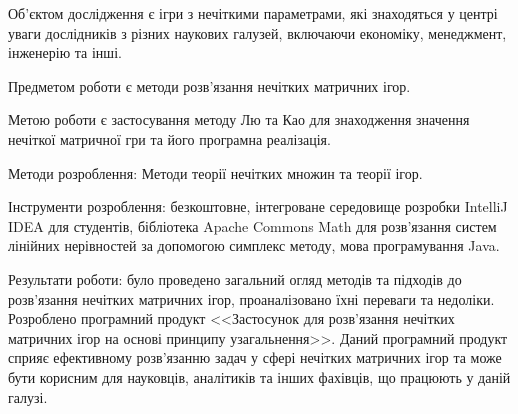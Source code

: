 \documentclass[14pt, a4paper, oneside]{extarticle}
\numberwithin{equation}{section}
\begin{document}
Об'єктом дослідження є ігри з нечіткими параметрами, які знаходяться у центрі уваги дослідників з різних наукових галузей, включаючи економіку, менеджмент, інженерію та інші. 

Предметом роботи є методи розв'язання нечітких матричних ігор.

Метою роботи є застосування методу Лю та Као для знаходження значення нечіткої матричної гри та його програмна реалізація.

Методи розроблення: Методи теорії нечітких множин та теорії ігор. 

Інструменти розроблення: безкоштовне, інтегроване середовище розробки IntelliJ IDEA для студентів, бібліотека Apache Commons Math для розв'язання систем лінійних нерівностей за допомогою симплекс методу, мова програмування Java.

Результати роботи: було проведено загальний огляд методів та підходів до розв'язання нечітких матричних ігор, проаналізовано їхні переваги та недоліки. Розроблено програмний продукт <<Застосунок для розв'язання нечітких матричних ігор на основі принципу узагальнення>>.
Даний програмний продукт сприяє ефективному розв'язанню задач у сфері нечітких матричних ігор та може бути корисним для науковців, аналітиків та інших фахівців, що працюють у даній галузі.



\clearpage
\renewcommand\cftsecdotsep{\cftdot}
\cftsetpnumwidth{9pt}

\renewcommand{\cfttoctitlefont}{\hfill\Large\bfseries\MakeUppercase}
\renewcommand{\cftaftertoctitle}{\hfill}

\renewcommand{\cftsecfont}{\normalfont}
\renewcommand{\cftsecpagefont}{\normalfont}
\renewcommand{\cftsubsecfont}{\normalfont}
\renewcommand{\cftsubsecpagefont}{\normalfont}
\renewcommand{\cftsubsubsecfont}{\normalfont}
\renewcommand{\cftsubsubsecpagefont}{\normalfont}

\renewcommand{\cftbeforesecskip}{0.5ex}
\renewcommand{\cftbeforesubsecskip}{0.5ex}
\renewcommand{\cftbeforesubsubsecskip}{0.5ex}

\tableofcontents

\thispagestyle{empty}
\end{document}
